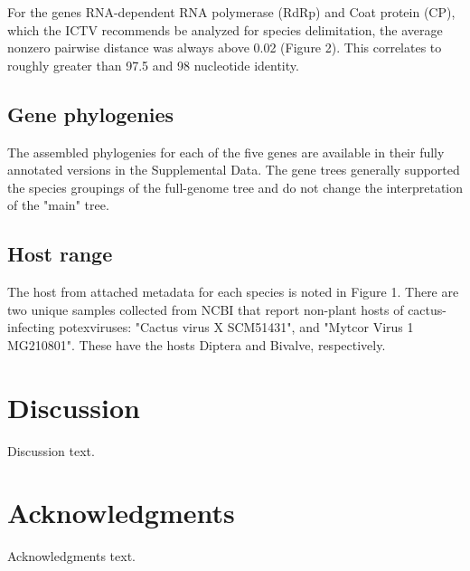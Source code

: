 \documentclass[11pt,letterpaper,titlepage]{article}
\begin{document}
\begin{linenumbers}
For the genes RNA-dependent RNA polymerase (RdRp) and Coat protein (CP), which the ICTV recommends be analyzed for species delimitation, the average nonzero pairwise distance was always  above 0.02 (Figure 2). 
This correlates to roughly greater than 97.5 and 98 nucleotide identity. 

\subsection*{Gene phylogenies}
The assembled phylogenies for each of the five genes are available in their fully annotated versions in the Supplemental Data. 
The gene trees generally supported the species groupings of the full-genome tree and do not change the interpretation of the "main" tree. 

\subsection*{Host range }
The host from attached metadata for each species is noted in Figure 1. 
There are two unique samples collected from NCBI that report non-plant hosts of cactus-infecting potexviruses: "Cactus virus X SCM51431", and "Mytcor Virus 1 MG210801". 
These have the hosts Diptera and Bivalve, respectively. 

\section*{Discussion}

Discussion text.

\section*{Acknowledgments}

Acknowledgments text.

\pagebreak
\raggedright{}
\setlength{\parindent}{0.0in}


\end{linenumbers}

\pagebreak
\frenchspacing
{}
\setlength{\parindent}{0.0in}
\end{document}
